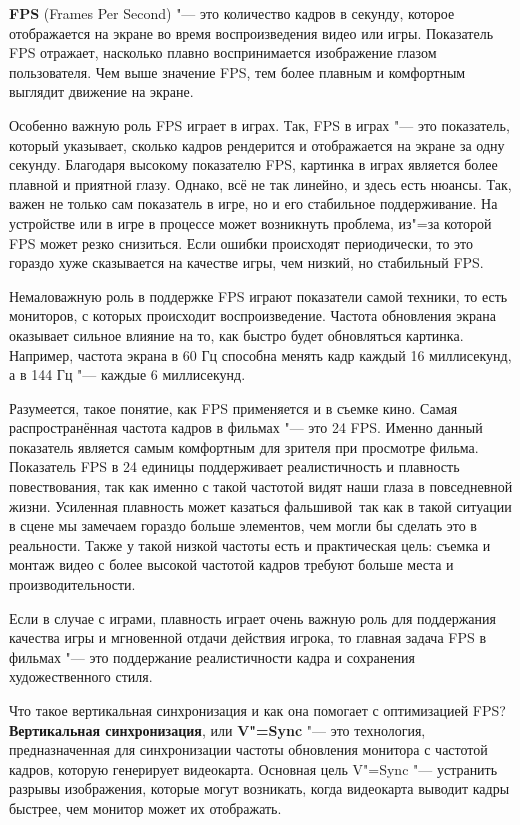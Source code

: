 \textbf{FPS} (Frames Per Second) "--- это количество кадров в секунду, которое отображается на экране во время воспроизведения видео или игры. Показатель FPS отражает, насколько плавно воспринимается изображение глазом пользователя. Чем выше значение FPS, тем более плавным и комфортным выглядит движение на экране.

Особенно важную роль FPS играет в играх. Так, FPS в играх "--- это показатель, который указывает, сколько кадров рендерится и отображается на экране за одну секунду. Благодаря высокому показателю FPS, картинка в играх является более плавной и приятной глазу. Однако, всё не так линейно, и здесь есть нюансы. Так, важен не только сам показатель в игре, но и его стабильное поддерживание. На устройстве или в игре в процессе может возникнуть проблема, из"=за которой FPS может резко снизиться. Если ошибки происходят периодически, то это гораздо хуже сказывается на качестве игры, чем низкий, но стабильный FPS.

Немаловажную роль в поддержке FPS играют показатели самой техники, то есть мониторов, с которых происходит воспроизведение. Частота обновления экрана оказывает сильное влияние на то, как быстро будет обновляться картинка. Например, частота экрана в 60 Гц способна менять кадр каждый 16 миллисекунд, а в 144 Гц "--- каждые 6 миллисекунд.

Разумеется, такое понятие, как FPS применяется и в съемке кино. Самая распространённая частота кадров в фильмах "--- это 24 FPS. Именно данный показатель является самым комфортным для зрителя при просмотре фильма. Показатель FPS в 24 единицы поддерживает реалистичность и плавность повествования, так как именно с такой частотой видят наши глаза в повседневной жизни. Усиленная плавность может казаться \flqq фальшивой\frqq\, так как в такой ситуации в сцене мы замечаем гораздо больше элементов, чем могли бы сделать это в реальности. Также у такой низкой частоты есть и практическая цель: съемка и монтаж видео с более высокой частотой кадров требуют больше места и производительности.

Если в случае с играми, плавность играет очень важную роль для поддержания качества игры и мгновенной отдачи действия игрока, то главная задача FPS в фильмах "--- это поддержание реалистичности кадра и сохранения художественного стиля.

Что такое вертикальная синхронизация и как она помогает с оптимизацией FPS? \textbf{Вертикальная синхронизация}, или \textbf{V"=Sync} "--- это технология, предназначенная для синхронизации частоты обновления монитора с частотой кадров, которую генерирует видеокарта. Основная цель V"=Sync "--- устранить разрывы изображения, которые могут возникать, когда видеокарта выводит кадры быстрее, чем монитор может их отображать.

